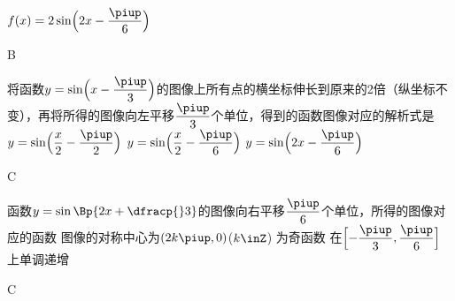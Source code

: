 \begin{exercise}
\begin{minipage}[t]{0.7\linewidth}
           {$f(x)=2\sin\Bigl(2x-\dfrac{\piup}6\Bigr)$}
        \end{minipage}\hfill
        \begin{minipage}[h]{0.3\linewidth}
           \vspace{0.5cm}
           \begin{center}
           \end{center}
        \end{minipage}
        \begin{answer}
          B
        \end{answer}
    \vspace{1.5em}
    \item%
      将函数$y=\sin\Bigl(x-\dfrac{\piup}3\Bigr)$的图像上所有点的横坐标伸长到原来的2倍（纵坐标不变），再将所得的图像向左平移$\dfrac{\piup}3$个单位，得到的函数图像对应的解析式是\xz
        {$y=\sin\Bigl(\dfrac x2-\dfrac{\piup}2\Bigr)$}
        {$y=\sin\Bigl(\dfrac{x}2-\dfrac{\piup}6\Bigr)$}
        {$y=\sin\Bigl(2x-\dfrac{\piup}6\Bigr)$}
      \begin{answer}
        C
      \end{answer}
    \vspace{1.5em}
    \item%
      函数$y=\sin\Bp{2x+\dfracp{}3}$的图像向右平移$\dfrac{\piup}6$个单位，所得的图像对应的函数\xz
       {图像的对称中心为$(2k\piup,0)$($k\inZ$)}
       {为奇函数}
       {在$\Bigl[-\dfrac{\piup}3,\dfrac{\piup}6\Bigr]$上单调递增}
      \begin{answer}
        C

\end{answer}
\end{exercise}
